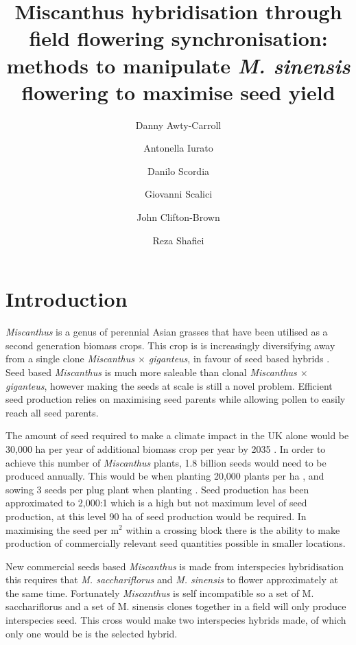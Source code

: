 \documentclass[fleqn, 15pt, lineno]{olplainarticle}
\title{Miscanthus hybridisation through field flowering synchronisation: methods to manipulate \textit{\textit{M. sinensis}} flowering to maximise seed yield}
\author[a*]{Danny Awty-Carroll}
\author[ab]{Antonella Iurato}
\author[c]{Danilo Scordia}
\author[d]{Giovanni Scalici}
\author[a]{John Clifton-Brown}
\author[e]{Reza Shafiei}
\affil[a]{Institute of Biological, Environmental and Rural Sciences, Gogerddan, Aberystwyth University, Ceredigion, UK}
\affil[b]{Terravesta, Lincoln, UK}
\affil[c]{Catania university}
\affil[d]{?}
\affil[e]{University of Dundee at JHI, Dundee, UK}
\affil[*]{Corresponding author: Danny Awty-Carroll, dga1@aber.ac.uk}
\begin{document}
\flushbottom
\maketitle
\thispagestyle{empty}


\doublespacing
\linenumbers
\section{Introduction}

\textit{Miscanthus} is a genus of perennial Asian grasses that have been utilised as a second generation biomass crops. 
This crop is is increasingly diversifying away from a single clone \textit{Miscanthus $\times$ giganteus}, in favour of seed based hybrids \citep{Clifton-Brown2019_progress}. 
Seed based \textit{Miscanthus} is much more saleable than clonal \textit{Miscanthus $\times$ giganteus}, however making the seeds at scale is still a novel problem. 
Efficient seed production relies on maximising seed parents while allowing pollen to easily reach all seed parents. 

The amount of seed required to make a climate impact in the UK alone would be 30,000 ha per year of additional biomass crop per year by 2035 \citep{Sixth_Carbon_Budget}. 
In order to achieve this number of \textit{Miscanthus} plants, 1.8 billion seeds would need to be produced annually. 
This would be when planting 20,000 plants per ha \citep{CliftonBrown2001,Rusinowski2019}, and sowing 3 seeds per plug plant when planting \citep{AwtyCarroll2020}. 
Seed production has been approximated to 2,000:1 \citep{Astley2017} which is a high but not maximum level of seed production, at this level 90 ha of seed production would be required. 
In maximising the seed per m$^2$ within a crossing block there is the ability to make production of commercially relevant seed quantities possible in smaller locations.

New commercial seeds based \textit{Miscanthus} is made from interspecies hybridisation this requires that \textit{M. sacchariflorus} and \textit{M. sinensis} to flower approximately at the same time.
Fortunately \textit{Miscanthus} is self incompatible \citep{HIRAYOSHI1955,Jiang2017} so a set of M. sacchariflorus and a set of M. sinensis clones together in a field will only produce interspecies seed.
This cross would make two interspecies hybrids made, of which only one would be is the selected hybrid. 
\end{document}
